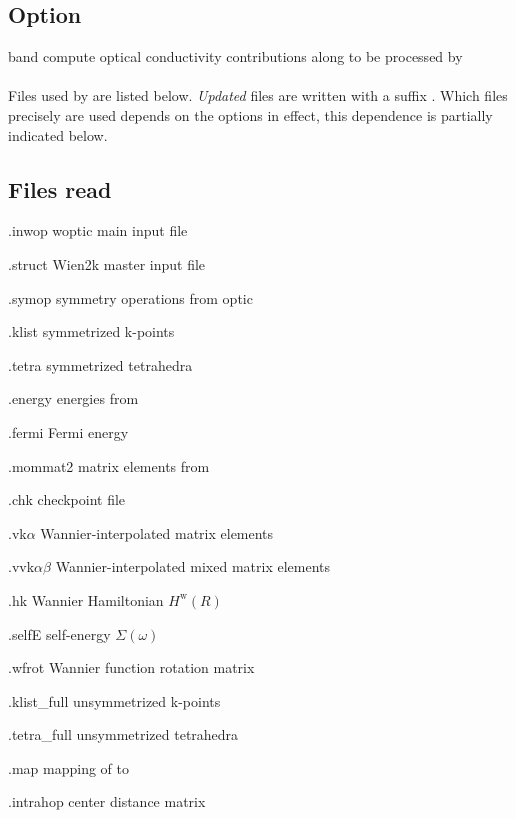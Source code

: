 \subsection{Option}
\begin{options}
\item [{\lvir[xshift=-2.65mm]}\td{}band] compute optical conductivity
  contributions along  to be processed by
  \kanalysis
\end{options}

\paragraph{} Files used by \womain are listed below.  \emph{Updated}
files are written with a suffix .  Which files precisely
are used depends on the options in effect, this dependence is
partially indicated below.

\subsection{Files read}
\begin{options}
\item [\case.inwop] woptic main input file 
\item [\case.struct] Wien2k master input file 
\item [\case.symop] symmetry operations from optic 
\item [\case.klist] symmetrized k-points 
\item [\case.tetra] symmetrized tetrahedra 
\item [\case.energy] energies from \lapwi
\item [\case.fermi] Fermi energy
\item [\case.mommat2] matrix elements from \optic
\item [\case.chk] \wannier checkpoint file 
\item [\case.vk$α$] Wannier-interpolated matrix elements
\item [\case.vvk$αβ$] Wannier-interpolated mixed matrix elements
\item [\case.hk] Wannier Hamiltonian $H^\text{w}(R)$
\item [\case.selfE] self-energy $Σ(ω)$ 
\item [\case.wfrot] Wannier function rotation matrix 
\item [\case.klist\_full] unsymmetrized k-points
\item [\case.tetra\_full] unsymmetrized tetrahedra 
\item [\case.map] mapping of  to 
\item [\case.intrahop] \wf center distance matrix 
\end{options}

